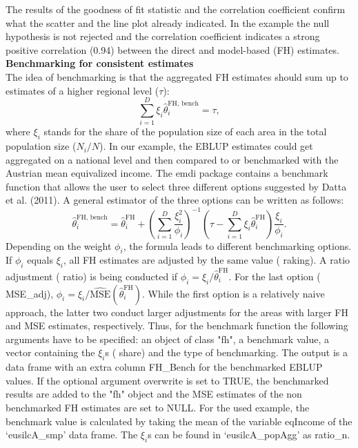 The results of the goodness of fit statistic and the correlation
coefficient confirm what the scatter and the line plot already
indicated. In the example the null hypothesis is not rejected and the
correlation coefficient indicates a strong positive correlation (0.94)
between the direct and model-based (FH) estimates.\\
\textbf{Benchmarking for consistent estimates}\\
The idea of benchmarking is that the aggregated FH estimates should sum
up to estimates of a higher regional level (\(\tau\)):
\[\sum_{i=1}^{D} \xi_{i} \hat{\theta}_{i}^{\text{FH, bench}} = \tau,\]
where \(\xi_{i}\) stands for the share of the population size of each area
in the total population size (\(N_{i}/N\)). In our example, the EBLUP
estimates could get aggregated on a national level and then compared to
or benchmarked with the Austrian mean equivalized income. The emdi
package contains a benchmark function that allows the user to select
three different options suggested by Datta et al. (2011). A general estimator of
the three options can be written as follows:
\[\hat{\theta}_{i}^{\text{FH, bench}} = \hat{\theta}_{i}^{\text{FH}} + \left( \sum_{i=1}^{D} \frac{\xi_{i}^2}{\phi_{i}} \right)^{-1} \left( \tau - \sum_{i=1}^{D} \xi_{i}\hat{\theta}_{i}^{\text{FH}}  \right) \frac{\xi_{i}}{\phi_{i}}.\]
Depending on the weight \(\phi_{i}\), the formula leads to different
benchmarking options. If \(\phi_{i}\) equals \(\xi_{i}\), all FH estimates
are adjusted by the same value ( raking). A ratio adjustment ( ratio) is
being conducted if \(\phi_{i} = \xi_{i}/\hat{\theta}_{i}^{\text{FH}}\).
For the last option ( MSE\_adj),
\(\phi_{i} = \xi_{i}/{\widehat{\text{MSE}}\left(\hat{\theta}_{i}^{\text{FH}}\right)}\).
While the first option is a relatively naive approach, the latter two
conduct larger adjustments for the areas with larger FH and MSE
estimates, respectively. Thus, for the benchmark function the following
arguments have to be specified: an object of class "fh", a benchmark
value, a vector containing the \(\xi_{i}\)s ( share) and the type of
benchmarking. The output is a data frame with an extra column FH\_Bench
for the benchmarked EBLUP values. If the optional argument overwrite is
set to TRUE, the benchmarked results are added to the "fh" object and
the MSE estimates of the non benchmarked FH estimates are set to NULL.
For the used example, the benchmark value is calculated by taking the
mean of the variable eqIncome of the `{eusilcA\_smp}' data
frame. The \(\xi_{i}\)s can be found in `{eusilcA\_popAgg}' as
ratio\_n.

